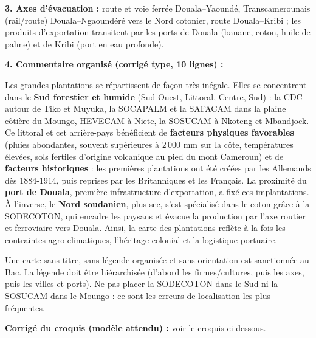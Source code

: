 \documentclass[11pt]{article}
\newcommand{\cle}[1]{{\popxbold\color{popdark}#1}}
\begin{document}
\begin{corrige}
\textbf{3. Axes d'évacuation :} route et voie ferrée Douala--Yaoundé, Transcamerounais (rail/route) Douala--Ngaoundéré vers le Nord cotonier, route Douala--Kribi ; les produits d'exportation transitent par les ports de \cle{Douala} (banane, coton, huile de palme) et de \cle{Kribi} (port en eau profonde).

\textbf{4. Commentaire organisé (corrigé type, 10 lignes) :}

Les grandes plantations se répartissent de façon très inégale. Elles se concentrent dans le \textbf{Sud forestier et humide} (Sud-Ouest, Littoral, Centre, Sud) : la CDC autour de Tiko et Muyuka, la SOCAPALM et la SAFACAM dans la plaine côtière du Moungo, HEVECAM à Niete, la SOSUCAM à Nkoteng et Mbandjock. Ce littoral et cet arrière-pays bénéficient de \textbf{facteurs physiques favorables} (pluies abondantes, souvent supérieures à $2\,000$ mm sur la côte, températures élevées, sols fertiles d'origine volcanique au pied du mont Cameroun) et de \textbf{facteurs historiques} : les premières plantations ont été créées par les Allemands dès 1884-1914, puis reprises par les Britanniques et les Français. La proximité du \textbf{port de Douala}, première infrastructure d'exportation, a fixé ces implantations. À l'inverse, le \textbf{Nord soudanien}, plus sec, s'est spécialisé dans le coton grâce à la SODECOTON, qui encadre les paysans et évacue la production par l'axe routier et ferroviaire vers Douala. Ainsi, la carte des plantations reflète à la fois les contraintes agro-climatiques, l'héritage colonial et la logistique portuaire.
\end{corrige}

\begin{attention}
Une carte sans titre, sans légende organisée et sans orientation est sanctionnée au Bac. La légende doit être hiérarchisée (d'abord les firmes/cultures, puis les axes, puis les villes et ports). Ne pas placer la SODECOTON dans le Sud ni la SOSUCAM dans le Moungo : ce sont les erreurs de localisation les plus fréquentes.
\end{attention}

\begin{corrige}
\textbf{Corrigé du croquis (modèle attendu) :} voir le croquis ci-dessous.
\end{corrige}
\end{document}
